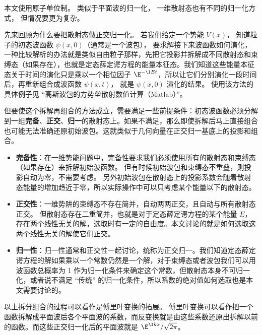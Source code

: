 

本文使用原子单位制。 类似于平面波的归一化， 一维散射态也有不同的归一化方式， 但情况要更为复杂。

先来回顾为什么要把散射态做正交归一化。 若我们给定一个势能 $V(x)$， 知道粒子的初态波函数 $\psi(x, 0)$（通常是一个波包）， 要求解接下来波函数如何演化，一种比较解析的办法就是类似自由粒子那样，先把它投影并拆解成不同散射态和束缚态（如果存在），也就是定态薛定谔方程的能量本征态。我们知道这些能量本征态关于时间的演化只是乘以一个相位因子 $\E^{-\I Et}$，所以让它们分别演化一段时间后，再重新组合成波函数 $\psi(x, t)$， 就是 $\psi(x, 0)$ 演化的结果。 使用该方法的具体例子见 “高斯波包的方势垒散射数值计算（Matlab）”。

但要使这个拆解再组合的方法成立，需要满足一些前提条件：初态波函数必须分解到一组\textbf{完备}、\textbf{正交}、\textbf{归一}的散射态上。如果不满足，那么即使拆解后马上直接组合也可能无法准确还原初始波包。这就类似于几何向量在正交归一基底上的投影和组合。

\begin{itemize}
\item \textbf{完备性}：在一维势能问题中，完备性要求我们必须使用所有的散射态和束缚态（如果存在）来拆解初始波函数。 但有时候初始波包和束缚态不重叠，则投影自动为零，不需要考虑。 另外初始波包在散射态上的投影系数会随着散射态能量的增加趋近于零，所以实际操作中可以只考虑某个能量以下的散射态。
\item \textbf{正交性}：一维势阱的束缚态不存在简并，自动两两正交，且自动与所有散射态正交。 但散射态存在二重简并，也就是对于定态薛定谔方程的某个能量 $E$，存在两个线性无关的解，选取时有一定的自由度。本文讨论的就是如何选取这两个线性无关的解使它们正交。
\item \textbf{归一性}：归一性通常和正交性一起讨论，统称为正交归一。我们知道定态薛定谔方程的解如果乘以一个常数仍然是一个解，对于束缚态或者波包我们可以用波函数总概率为 1 作为归一化条件来确定这个常数，但散射态本身不可归一化，或者说不满足 “传统” 的归一化条件，所以系数的绝对值如何选取也是本文需要讨论的。
\end{itemize}

以上拆分组合的过程可以看作是傅里叶变换的拓展。 傅里叶变换可以看作把一个函数拆解成平面波后各个平面波的系数，而反变换就是由这些系数还原出拆解以前的函数。而这些正交归一化后的平面波就是 $\E^{\I k x}/\sqrt{2\pi}$。

